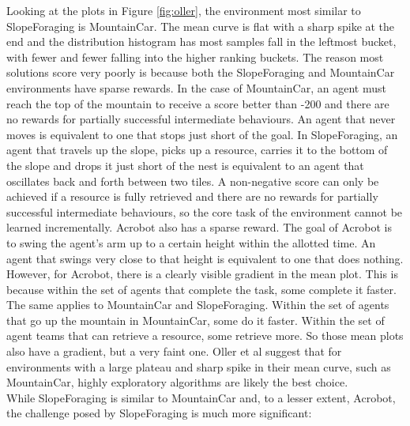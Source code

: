 \documentclass[12pt]{article}
\begin{document}
Looking at the plots in Figure \ref{fig:oller}, the environment most similar to SlopeForaging is MountainCar.
The mean curve is flat with a sharp spike at the end and the distribution histogram has most samples fall in the leftmost bucket, with fewer and fewer falling into the higher ranking buckets.
The reason most solutions score very poorly is because both the SlopeForaging and MountainCar environments have sparse rewards.
In the case of MountainCar, an agent must reach the top of the mountain to receive a score better than -200 and there are no rewards for partially successful intermediate behaviours. 
An agent that never moves is equivalent to one that stops just short of the goal. 
In SlopeForaging, an agent that travels up the slope, picks up a resource, carries it to the bottom of the slope and drops it just short of the nest is equivalent to an agent that oscillates back and forth between two tiles. 
A non-negative score can only be achieved if a resource is fully retrieved and there are no rewards for partially successful intermediate behaviours, so the core task of the environment cannot be learned incrementally.
Acrobot also has a sparse reward.
The goal of Acrobot is to swing the agent's arm up to a certain height within the allotted time.
An agent that swings very close to that height is equivalent to one that does nothing.
However, for Acrobot, there is a clearly visible gradient in the mean plot.
This is because within the set of agents that complete the task, some complete it faster.
The same applies to MountainCar and SlopeForaging.
Within the set of agents that go up the mountain in MountainCar, some do it faster.
Within the set of agent teams that can retrieve a resource, some retrieve more.
So those mean plots also have a gradient, but a very faint one.
Oller et al suggest that for environments with a large plateau and sharp spike in their mean curve, such as MountainCar, highly exploratory algorithms are likely the best choice.\\

While SlopeForaging is similar to MountainCar and, to a lesser extent, Acrobot, the challenge posed by SlopeForaging is much more significant:
\end{document}
